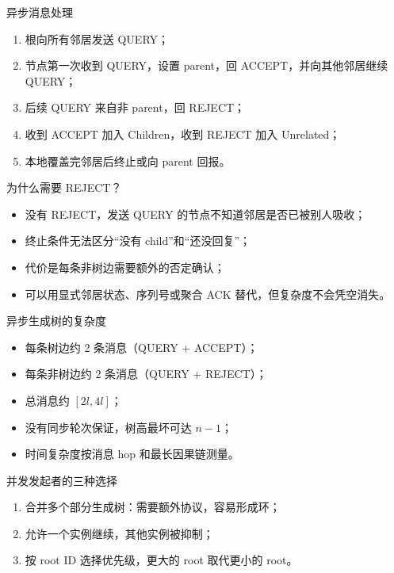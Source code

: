 \documentclass[UTF8,fontset=none,aspectratio=169,10pt]{beamer}
\begin{document}
\begin{frame}{异步消息处理}
\begin{enumerate}
  \item 根向所有邻居发送 QUERY；
  \item 节点第一次收到 QUERY，设置 parent，回 ACCEPT，并向其他邻居继续 QUERY；
  \item 后续 QUERY 来自非 parent，回 REJECT；
  \item 收到 ACCEPT 加入 Children，收到 REJECT 加入 Unrelated；
  \item 本地覆盖完邻居后终止或向 parent 回报。
\end{enumerate}
\end{frame}

\begin{frame}{为什么需要 REJECT？}
\begin{itemize}
  \item 没有 REJECT，发送 QUERY 的节点不知道邻居是否已被别人吸收；
  \item 终止条件无法区分“没有 child”和“还没回复”；
  \item 代价是每条非树边需要额外的否定确认；
  \item 可以用显式邻居状态、序列号或聚合 ACK 替代，但复杂度不会凭空消失。
\end{itemize}
\end{frame}

\begin{frame}{异步生成树的复杂度}
\begin{itemize}
  \item 每条树边约 2 条消息（QUERY + ACCEPT）；
  \item 每条非树边约 2 条消息（QUERY + REJECT）；
  \item 总消息约 $[2l,4l]$；
  \item 没有同步轮次保证，树高最坏可达 $n-1$；
  \item 时间复杂度按消息 hop 和最长因果链测量。
\end{itemize}
\end{frame}


\begin{frame}{并发发起者的三种选择}
\begin{enumerate}
  \item 合并多个部分生成树：需要额外协议，容易形成环；
  \item 允许一个实例继续，其他实例被抑制；
  \item 按 root ID 选择优先级，更大的 root 取代更小的 root。
\end{enumerate}
\vfill
{}
\end{frame}
\end{document}
